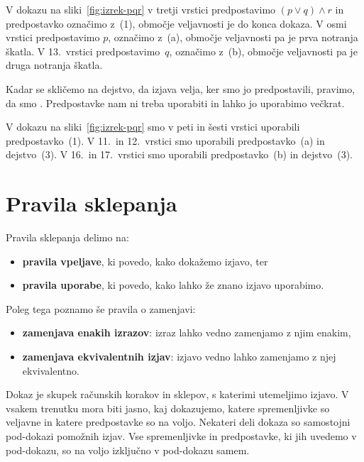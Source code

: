 \begin{zgled}
  V dokazu na sliki~\ref{fig:izrek-pqr} v tretji vrstici predpostavimo $(p \lor q) \land r$ in predpostavko označimo z~(1), območje veljavnosti je do konca dokaza. V osmi vrstici predpostavimo $p$, označimo z~(a), območje veljavnosti pa je prva notranja škatla. V 13.~vrstici predpostavimo~$q$, označimo z~(b), območje veljavnosti pa je druga notranja škatla.
\end{zgled}

Kadar se skličemo na dejstvo, da izjava velja, ker smo jo predpostavili, pravimo, da smo . Predpostavke nam ni treba uporabiti in lahko jo uporabimo večkrat.

\begin{zgled}
  V dokazu na sliki~\ref{fig:izrek-pqr} smo v peti in šesti vrstici uporabili predpostavko~(1).
  V 11.~in 12.~vrstici smo uporabili predpostavko~(a) in dejstvo~(3).
  V 16.~in 17.~vrstici smo uporabili predpostavko~(b) in dejstvo~(3).
\end{zgled}


\section{Pravila sklepanja}
\label{sec:pravila-sklepanja}

Pravila sklepanja delimo na:
%
\begin{itemize}
\item \textbf{pravila vpeljave}, ki povedo, kako dokažemo izjavo, ter
\item \textbf{pravila uporabe}, ki povedo, kako lahko že znano izjavo uporabimo.
\end{itemize}
%
Poleg tega poznamo še pravila o zamenjavi:
%
\begin{itemize}
\item \textbf{zamenjava enakih izrazov}: izraz lahko vedno zamenjamo z njim enakim,
\item \textbf{zamenjava ekvivalentnih izjav}: izjavo vedno lahko zamenjamo z njej ekvivalentno.
\end{itemize}

Dokaz je skupek računskih korakov in sklepov, s katerimi utemeljimo izjavo. V vsakem
trenutku mora biti jasno, kaj dokazujemo, katere spremenljivke so veljavne in katere
predpostavke so na voljo.
%
Nekateri deli dokaza so samostojni pod-dokazi pomožnih izjav. Vse spremenljivke in
predpostavke, ki jih uvedemo v pod-dokazu, so na voljo izključno v pod-dokazu samem.


